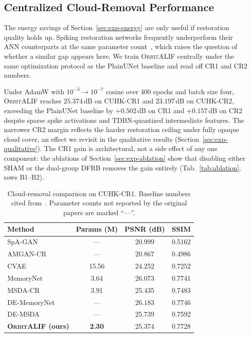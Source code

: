 \documentclass[conference]{IEEEtran}
\newcommand{\OrbitALIF}{\textsc{OrbitALIF}}
\newcommand{\DFRB}{\textsc{DFRB}}
\newcommand{\SHAM}{\textsc{SHAM}}
\begin{document}
\subsection{Centralized Cloud-Removal Performance}\label{sec:exp-centralized}

The energy savings of Section~\ref{sec:exp-energy} are only useful
if restoration quality holds up. Spiking restoration networks
frequently underperform their ANN counterparts at the same
parameter count~\cite{ref:esdnet}, which raises the question of
whether a similar gap appears here. We train \OrbitALIF{} centrally
under the same optimization protocol as the PlainUNet baseline and
read off CR1 and CR2 numbers.

Under AdamW with $10^{-3}\!\to\!10^{-7}$ cosine over $400$ epochs
and batch size four, \OrbitALIF{} reaches $25.374$\,dB on CUHK-CR1
and $23.197$\,dB on CUHK-CR2, exceeding the PlainUNet baseline by
$+0.502$\,dB on CR1 and $+0.157$\,dB on CR2 despite sparse spike
activations and TDBN-quantized intermediate features. The narrower
CR2 margin reflects the harder restoration ceiling under fully
opaque cloud cover, an effect we revisit in the qualitative results
(Section~\ref{sec:exp-qualitative}). The CR1 gain is architectural,
not a side effect of any one component: the ablations of
Section~\ref{sec:exp-ablation} show that disabling either \SHAM{}
or the dual-group \DFRB{} removes the gain entirely
(Tab.~\ref{tab:ablation}, rows B1--B2).

\begin{table}[!t]
\centering
\caption{Cloud-removal comparison on CUHK-CR1. Baseline numbers
cited from~\cite{ref:cuhkcr}. Parameter counts not reported by the
original papers are marked ``---''.}
\label{tab:cr1-bench}
\setlength{\tabcolsep}{4.0pt}
\renewcommand{\arraystretch}{0.95}
\footnotesize
\begin{tabular}{lccc}
\toprule
Method                            & Params (M)    & PSNR (dB)         & SSIM              \\
\midrule
SpA-GAN~\cite{ref:cuhkcr}         & ---           & 20.999            & 0.5162            \\
AMGAN-CR~\cite{ref:cuhkcr}        & ---           & 20.867            & 0.4986            \\
CVAE~\cite{ref:cuhkcr}            & 15.56         & 24.252            & 0.7252            \\
MemoryNet~\cite{ref:cuhkcr}       & 3.64          & 26.073            & 0.7741            \\
MSDA-CR~\cite{ref:cuhkcr}         & 3.91          & 25.435            & 0.7483            \\
DE-MemoryNet~\cite{ref:cuhkcr}    & ---           & $\mathbf{26.183}$ & $\mathbf{0.7746}$ \\
DE-MSDA~\cite{ref:cuhkcr}         & ---           & 25.739            & 0.7592            \\
\midrule
\textbf{\OrbitALIF{} (ours)}      & \textbf{2.30} & 25.374            & 0.7728            \\
\bottomrule
\end{tabular}
\vspace{-1mm}
\end{table}
\end{document}
